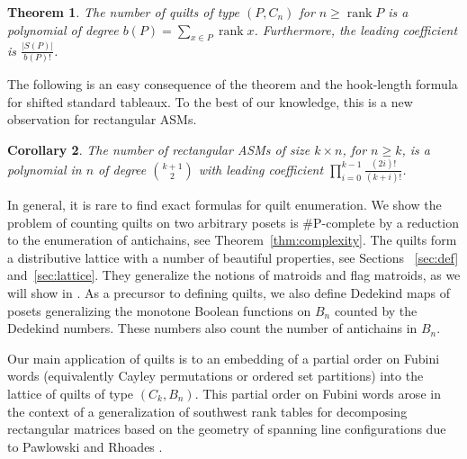 \documentclass[12pt]{amsart}
\numberwithin{equation}{section}
\newtheorem{theorem}{Theorem}[section]
\newtheorem{cor}[theorem]{Corollary}
\theoremstyle{definition}
\newcommand{\rank}{\operatorname{rank}}
\begin{document}
\begin{theorem}
 The number of quilts of type $(P,C_n)$ for $n \geq \rank P$ is a polynomial of degree $b(P) = \sum_{x \in P} \rank x$. Furthermore, the leading coefficient is $\frac{|S(P)|}{b(P)!}$.
\end{theorem}

The following is an easy consequence of the theorem and the
hook-length formula for shifted standard tableaux.  To the best of our
knowledge, this is a new observation for rectangular ASMs.  


\begin{cor}
 The number of rectangular ASMs of size $k \times n$, for $n \geq k$,
 is a polynomial in $n$ of degree ${\binom{k+1}2}$ with leading
 coefficient $\prod_{i=0}^{k-1}\frac{ (2i)!}{(k + i)!}$.
 \end{cor}

In general, it is rare to find exact formulas for quilt enumeration.
We show the problem of counting quilts on two arbitrary posets is
\#P-complete by a reduction to the enumeration of antichains, see
Theorem~\ref{thm:complexity}.  The quilts form a distributive lattice
with a number of beautiful properties, see Sections~ \ref{sec:def}
and~\ref{sec:lattice}.  They generalize the notions of matroids and
flag matroids, as we will show in .  As a precursor
to defining quilts, we also define Dedekind maps of posets
generalizing the monotone Boolean functions on $B_{n}$ counted by the
Dedekind numbers.  These numbers also count the number of antichains
in $B_{n}$.
 
Our main application of quilts is to an embedding of a partial order
on Fubini words (equivalently Cayley permutations or ordered set
partitions) into the lattice of quilts of type $(C_{k}, B_{n})$.  This
partial order on Fubini words arose in the context of a generalization
of southwest rank tables for decomposing rectangular matrices based on
the geometry of spanning line configurations due to Pawlowski and
Rhoades \cite{PR}.
\end{document}
